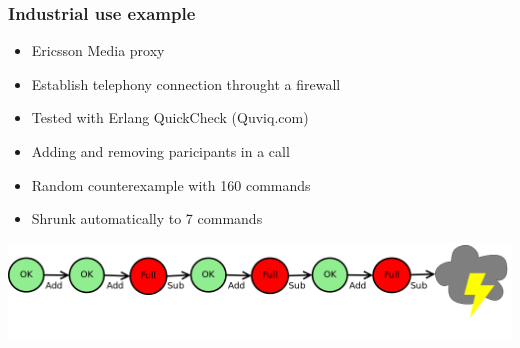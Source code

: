 \documentclass{beamer}
\begin{document}
\begin{frame}
  \frametitle{Industrial use example}

\begin{itemize}
\item Ericsson Media proxy
\item Establish telephony connection throught a firewall
\item Tested with Erlang QuickCheck (Quviq.com)
\item Adding and removing paricipants in a call
\item Random counterexample with 160 commands
\item Shrunk automatically to 7 commands
\end{itemize}

\begin{center}
\includegraphics[width=\textwidth]{images/media1}
\end{center}
\end{frame}
\end{document}
